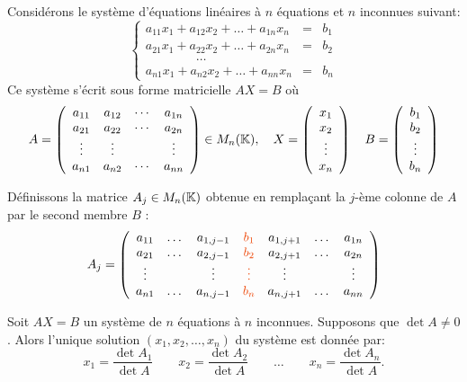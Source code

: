 \documentclass[10pt,class=article,crop=false]{standalone}
\begin{document}
\begin{multicols}{2}
Considérons le système d'équations linéaires à $n$ équations et $n$ inconnues suivant:
\[
\left\{
\begin{array}{ccc}
	a_{11} x_1 + a_{12} x_2 + \dots + a_{1n} x_{n} & = & b_1\\
	a_{21} x_1 + a_{22} x_2 + \dots + a_{2n} x_n & = & b_2\\
	\qquad\qquad \dots \qquad\qquad &  &\\
	a_{n1} x_1 + a_{n2} x_2 + \dots + a_{nn} x_n & = & b_n
\end{array}
\right.
\]
Ce système s'écrit sous forme matricielle $AX=B$ où
$$
A = \left(
\begin{array}{cccc}
	a_{11} & a_{12} & \cdots & a_{1n}\\
	a_{21} & a_{22} & \cdots & a_{2n}\\
	\vdots & \vdots && \vdots\\
	a_{n1} & a_{n2}& \cdots &a_{nn}
\end{array}\right) \in M_{n}(\mathbb{K}), 
\quad X= \left( \begin{array}{c}x_1\\x_2 \\\vdots \\x_n \end{array} \right) 
\quad B=\left( \begin{array}{c}b_1\\b_2 \\\vdots \\b_n \end{array} \right)
$$


Définissons la matrice $A_j \in M_{n}(\mathbb{K})$ obtenue en remplaçant la $j$-ème
colonne de $A$ par le second membre $B$ :
$$
A_j = \left(
\begin{array}{ccccccc}
	a_{11} &  \dots & a_{1,j-1} & {\color{myred}b_1} & a_{1,j+1} & \dots & a_{1n}\\
	a_{21} & \dots & a_{2,j-1}& {\color{myred}b_2} & a_{2,j+1}& \dots & a_{2n}\\
	\vdots &  & \vdots & {\color{myred}\vdots} & \vdots& &\vdots\\
	a_{n1} &\dots & a_{n,j-1}& {\color{myred}b_n}& a_{n,j+1}& \dots & a_{nn}
\end{array}\right)
$$


\begin{theoreme} 
Soit $AX = B$ un système de $n$ équations  à $n$ inconnues. Supposons que $\det A \neq 0$.
Alors l'unique solution $(x_1,x_2,\ldots,x_n)$ du système est donnée par:
$$
x_1 = \frac{\det A_1}{\det A} \qquad x_2 = \frac{\det A_2}{\det A} \qquad \ldots \qquad x_n = \frac{\det A_n}{\det A}.
$$
\end{theoreme}






\end{multicols}
\end{document}
